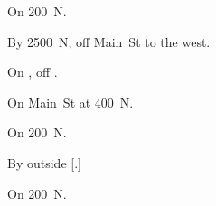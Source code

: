 
\begin{LocationList}

On  200~N.

By  2500~N, off  Main~St to the west.

On , off  .

On  Main~St at  400~N.

On  200~N.

By  outside [.]

\Location{\TruckStop \Gas \Rest \Service \Weigh}
On  200~N.

\end{LocationList}
